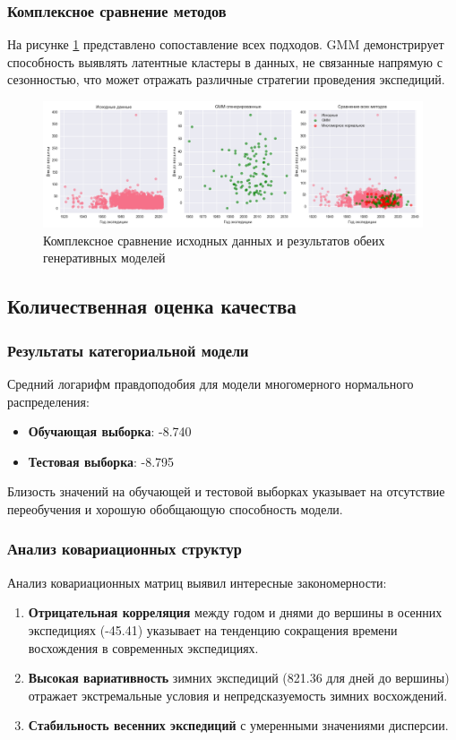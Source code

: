 \documentclass[12pt, a4paper]{article}
\begin{document}
\subsubsection{Комплексное сравнение методов}
На рисунке \ref{fig:comparison} представлено сопоставление всех подходов. GMM демонстрирует способность выявлять латентные кластеры в данных, не связанные напрямую с сезонностью, что может отражать различные стратегии проведения экспедиций.

\begin{figure}[H]
    \centering
    \includegraphics[width=1\textwidth]{Figure_4.png}
    \caption{Комплексное сравнение исходных данных и результатов обеих генеративных моделей}
    \label{fig:comparison}
\end{figure}

\subsection{Количественная оценка качества}
\subsubsection{Результаты категориальной модели}
Средний логарифм правдоподобия для модели многомерного нормального распределения:
\begin{itemize}
    \item \textbf{Обучающая выборка}: -8.740
    \item \textbf{Тестовая выборка}: -8.795
\end{itemize}

Близость значений на обучающей и тестовой выборках указывает на отсутствие переобучения и хорошую обобщающую способность модели.

\subsubsection{Анализ ковариационных структур}
Анализ ковариационных матриц выявил интересные закономерности:
\begin{enumerate}
    \item \textbf{Отрицательная корреляция} между годом и днями до вершины в осенних экспедициях (-45.41) указывает на тенденцию сокращения времени восхождения в современных экспедициях.
    \item \textbf{Высокая вариативность} зимних экспедиций (821.36 для дней до вершины) отражает экстремальные условия и непредсказуемость зимних восхождений.
    \item \textbf{Стабильность весенних экспедиций} с умеренными значениями дисперсии.
\end{enumerate}
\end{document}
